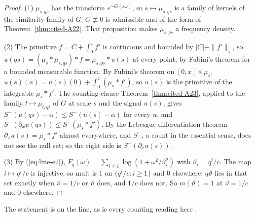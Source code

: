 \begin{proof}
(1) $\mu_{s,qs}$ has the transform $e^{-G(s\omega)}$, so $s \mapsto \mu_{s,qs}$ is a family of
kernels of the similarity family of $G$. $G \not\equiv 0$ is admissible and of the form of
Theorem~\ref{thm:cited-A22}. That proposition makes
$\mu_{s,qs}$ a \Polya{} frequency density.

(2) The primitive $f = C + \int_0^xf'$ is continuous and bounded by $|C| + \|f'\|_1$, so
$u(qs) = (\mu_s * \mu_{s,qs}) * f = \mu_{s,qs} * u(s)$ at every point, by Fubini's theorem for a
bounded measurable function. By Fubini's theorem on $[0,x] \times \mu_s$,
$u(s)(x) = u(s)(0) + \int_0^x(\mu_s * f')$, so $u(s)$ is the primitive of the integrable
$\mu_s * f'$. The counting clause Theorem~\ref{thm:cited-A23}, applied to the family $t \mapsto \mu_{t,qt}$ of $G$ at scale $s$
and the signal $u(s)$, gives $S^-(u(qs) - \alpha) \le S^-(u(s) - \alpha)$ for every $\alpha$, and
$S^-(\partial_xu(qs)) \le S^-(\mu_s * f')$. By the Lebesgue differentiation theorem
$\partial_xu(s) = \mu_s * f'$ almost everywhere, and $S^-$, a count in the essential sense, does not
see the null set; so the right side is $S^-(\partial_xu(s))$.

(3) By (\ref{eq:line-e7}), $F_q(\omega) = \sum_{i \ge 1}\log(1 + \omega^2/\vartheta_i^2)$ with
$\vartheta_i = q^i/c$. The map $i \mapsto q^i/c$ is injective, so $\mathrm{mult}$ is $1$ on $\{q^i/c : i \ge 1\}$
and $0$ elsewhere; $q\vartheta$ lies in that set exactly when $\vartheta = 1/c$ or $\vartheta$ does,
and $1/c$ does not. So $m(\vartheta) = 1$ at $\vartheta = 1/c$ and $0$ elsewhere.
\end{proof}

The statement is on the line, as is every counting reading here .

